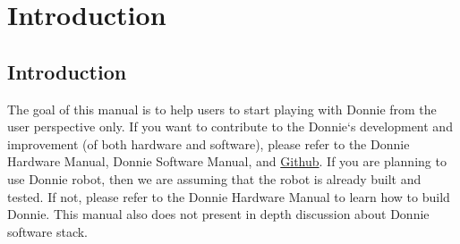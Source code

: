 \chapter{Introduction}

\section{Introduction}
\label{sec:intro}

The goal of this manual is to help users to start playing with Donnie from the user perspective only.
If you want to contribute to the Donnie`s development and improvement (of both hardware and software),
please refer to the Donnie Hardware Manual, Donnie Software Manual, and \href{https://github.com/lsa-pucrs/donnie-assistive-robot-sw}{Github}.
If you are planning to use Donnie robot, then we are assuming that the robot is already built and tested.
If not, please refer to the Donnie Hardware Manual to learn how to build Donnie.
This manual also does not present in depth discussion about Donnie software stack.
